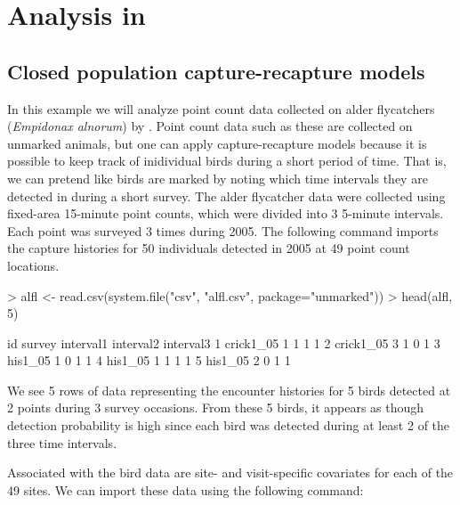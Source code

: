 \documentclass[a4paper]{article}
\renewenvironment{Schunk}{\vspace{\topsep}}{\vspace{\topsep}}
\begin{document}
\section*{Analysis in }




\subsection*{Closed population capture-recapture models}


In this example we will analyze point count data collected on alder
flycatchers (\emph{Empidonax alnorum}) by
\citet{chandler_etal:2009}. Point count data such as these are
collected on unmarked animals, but one can apply
capture-recapture models because it is possible to keep track of
inidividual birds during a short period of time. That is, we can
pretend like birds are marked by noting which time intervals they are
detected in during a short survey. The alder flycatcher data were
collected using fixed-area 15-minute point counts, which were divided
into 3
5-minute intervals. Each point was surveyed 3 times during 2005.
The following command imports the
capture histories for 50 individuals detected in 2005 at 49 point
count locations.

\vspace{3cm}

\begin{Schunk}
\begin{Sinput}
> alfl <- read.csv(system.file("csv", "alfl.csv", package="unmarked"))
> head(alfl, 5)
\end{Sinput}
\begin{Soutput}
         id survey interval1 interval2 interval3
1 crick1_05      1         1         1         1
2 crick1_05      3         1         0         1
3   his1_05      1         0         1         1
4   his1_05      1         1         1         1
5   his1_05      2         0         1         1
\end{Soutput}
\end{Schunk}

We see 5 rows of data representing the encounter histories for 5 birds
detected at 2 points during 3 survey occasions. From these 5 birds, it appears as though
detection probability is high since each bird was detected during at
least 2 of the three time intervals.

Associated with the bird data are site- and visit-specific covariates
for each of the 49 sites. We can import these data using the following
command:
\end{document}
